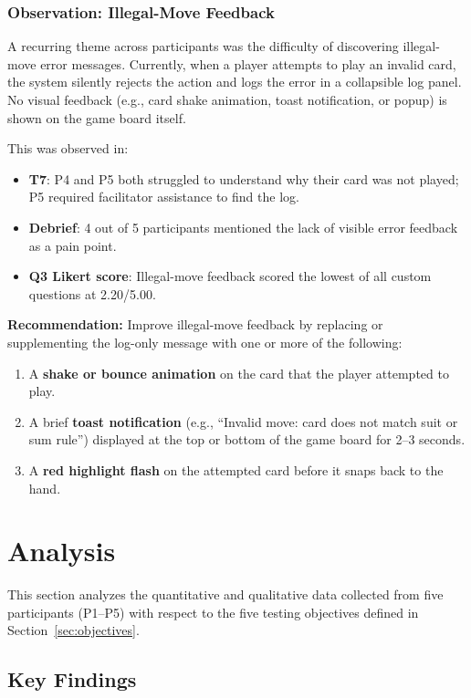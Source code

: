 \documentclass[12pt, titlepage]{article}
\begin{document}
\subsubsection{Observation: Illegal-Move Feedback}\label{sec:error-feedback}

A recurring theme across participants was the difficulty of discovering illegal-move error messages. Currently, when a player attempts to play an invalid card, the system silently rejects the action and logs the error in a collapsible log panel. No visual feedback (e.g., card shake animation, toast notification, or popup) is shown on the game board itself.

This was observed in:
\begin{itemize}
  \item \textbf{T7}: P4 and P5 both struggled to understand why their card was not played; P5 required facilitator assistance to find the log.
  \item \textbf{Debrief}: 4 out of 5 participants mentioned the lack of visible error feedback as a pain point.
  \item \textbf{Q3 Likert score}: Illegal-move feedback scored the lowest of all custom questions at 2.20/5.00.
\end{itemize}

\noindent\textbf{Recommendation:} Improve illegal-move feedback by replacing or supplementing the log-only message with one or more of the following:
\begin{enumerate}
  \item A \textbf{shake or bounce animation} on the card that the player attempted to play.
  \item A brief \textbf{toast notification} (e.g., ``Invalid move: card does not match suit or sum rule'') displayed at the top or bottom of the game board for 2--3 seconds.
  \item A \textbf{red highlight flash} on the attempted card before it snaps back to the hand.
\end{enumerate}


\section{Analysis}\label{sec:analysis}

This section analyzes the quantitative and qualitative data collected from five participants (P1--P5) with respect to the five testing objectives defined in Section~\ref{sec:objectives}.

\subsection{Key Findings}
\end{document}
